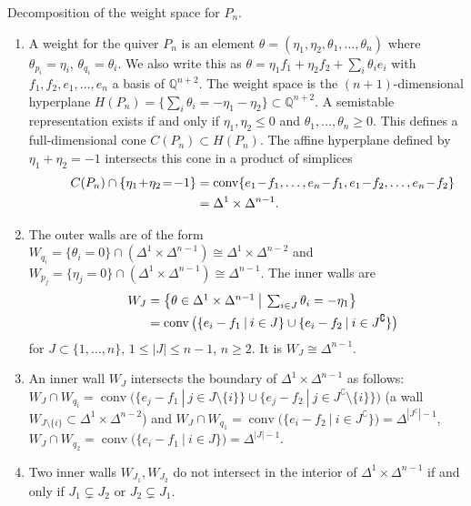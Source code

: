 \documentclass[ALCO,ThmDefs,Unicode,epreuves]{cedram}
\def\Q{\mathds Q}
\DeclareMathOperator{\conv}{conv}
\begin{document}
\begin{rema}\label{rem:Pn-weightspace} 
Decomposition of the weight space for $P_n$.%

\begin{enumerate}[label=(\arabic*)]
\item\label{rema2.4_1}
A weight for the quiver $P_n$ is an element
$\theta=(\eta_1,\eta_2,\theta_1,\ldots,\theta_n)$ where
$\theta_{p_i}=\eta_i$, $\theta_{q_i}=\theta_i$. We also write this as 
$\theta=\eta_1f_1+\eta_2f_2+\sum_i\theta_ie_i$ with 
$f_1,f_2,e_1,\ldots,e_n$ a basis of $\Q^{n+2}$.
The weight space is the $(n+1)$-dimensional hyperplane 
$H(P_n)=\{\sum_i\theta_i=-\eta_1-\eta_2\}\subset\Q^{n+2}$.
A semistable representation exists if and only if 
$\eta_1,\eta_2\leq0$ and $\theta_1,\ldots,\theta_n\geq 0$. 
This defines a full-dimensional cone $C(P_n)\subset H(P_n)$.
The affine hyperplane defined by $\eta_1+\eta_2=-1$ intersects this cone in
a product of simplices
\[
\hspace*{\leftmargini}
\begin{aligned}
C(P_n)\cap\{\eta_1\!+\!\eta_2\!=\!-1\}
&=\conv\{e_1\!-\!f_1,\ldots,e_n\!-\!f_1,e_1\!-\!f_2,\ldots,e_n\!-\!f_2\}\\
&=\Delta^1\times\Delta^{n-1}.
\end{aligned}
\]
\item\label{rema2.4_2}
The outer walls are of the form 
$W_{q_i}=\{\theta_i=0\}\cap(\Delta^1\times\Delta^{n-1})
\cong\Delta^1\times\Delta^{n-2}$ and 
$W_{p_j}=\{\eta_j=0\}\cap(\Delta^1\times\Delta^{n-1})\cong\Delta^{n-1}$.
The inner walls are 
\[\textstyle
\hspace*{\leftmargini}
\begin{aligned}
W_J&\textstyle =\left\{\theta\in\Delta^1\times\Delta^{n-1}\:\big|\:\sum_{i\in J}\theta_i=-\eta_1\right\}\\
&=\conv\big(\{e_i-f_1\:|\:i\in J\}\cup\{e_i-f_2\:|\:i\in J^\complement\}\big)
\end{aligned}
\]
for $J\subset\{1,\ldots,n\}$, $1\leq|J|\leq n-1$, $n\geq2$. 
It is $W_J\cong\Delta^{n-1}$.%
\item\label{rema2.4_3}
An inner wall $W_J$ intersects the boundary of $\Delta^1\times\Delta^{n-1}$
as follows:
$W_J\cap W_{q_i}=\conv\big(\{e_j-f_1\:|\:j\in J\setminus\{i\}\}\cup\{e_j-f_2\:|\:
j\in J^\complement\setminus\{i\}\}\big)$ 
(\ie a wall $W_{J\setminus\{i\}}\subset\Delta^1\times\Delta^{n-2}$)
and
$W_J\cap W_{q_1}=\conv\big(\{e_i-f_2\:|\:i\in J^\complement\}\big)
=\Delta^{|J^\complement|-1}$, 
$W_J\cap W_{q_2}=\conv\big(\{e_i-f_1\:|\:i\in J\}\big)
=\Delta^{|J|-1}$.%
\item\label{rema2.4_4}
Two inner walls $W_{J_1},W_{J_2}$ do not intersect in the interior of 
$\Delta^1\times\Delta^{n-1}$ if and only if $J_1\subsetneq J_2$
or $J_2\subsetneq J_1$.
\end{enumerate}
\end{rema}
\end{document}
